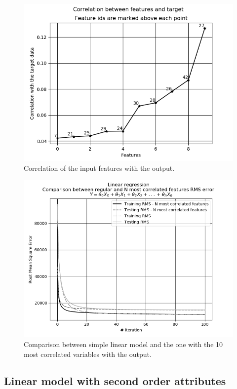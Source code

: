 \documentclass[10pt,twocolumn,letterpaper]{article}
\begin{document}
\begin{figure}
    \centering
    \includegraphics[width=0.9\columnwidth]{img/lr-selection.png}
    \caption{Correlation of the input features with the output.}
    \label{fig:correlation}
\end{figure}

\begin{figure}
    \centering
    \includegraphics[width=0.9\columnwidth]{img/lr-comparation-selection.png}
    \caption{Comparison between simple linear model and the one with the 10 most correlated variables with the output.}
    \label{fig:comparison-selection}
\end{figure}

\subsection{Linear model with second order attributes}
\end{document}
